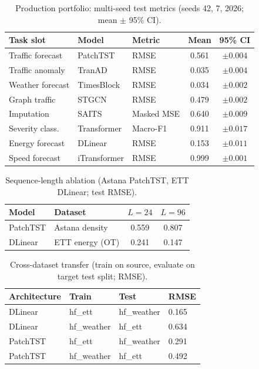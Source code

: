 \begin{table}[H]
  \centering
  \caption{Production portfolio: multi-seed test metrics (seeds 42, 7, 2026; mean $\pm$ 95\% CI).}
  \label{tab:multiseed_aggregate}
  \small
  \begin{tabular}{@{}lllcc@{}}
    \toprule
    \textbf{Task slot} & \textbf{Model} & \textbf{Metric} & \textbf{Mean} & \textbf{95\% CI} \\
    \midrule
    Traffic forecast & PatchTST & RMSE & 0.561 & $\pm 0.004$ \\
    Traffic anomaly & TranAD & RMSE & 0.035 & $\pm 0.004$ \\
    Weather forecast & TimesBlock & RMSE & 0.034 & $\pm 0.002$ \\
    Graph traffic & STGCN & RMSE & 0.479 & $\pm 0.002$ \\
    Imputation & SAITS & Masked MSE & 0.640 & $\pm 0.009$ \\
    Severity class. & Transformer & Macro-F1 & 0.911 & $\pm 0.017$ \\
    Energy forecast & DLinear & RMSE & 0.153 & $\pm 0.011$ \\
    Speed forecast & iTransformer & RMSE & 0.999 & $\pm 0.001$ \\
    \bottomrule
  \end{tabular}
\end{table}

\begin{table}[H]
  \centering
  \caption{Sequence-length ablation (Astana PatchTST, ETT DLinear; test RMSE).}
  \label{tab:seq_ablation}
  \begin{tabular}{@{}llcc@{}}
    \toprule
    \textbf{Model} & \textbf{Dataset} & $L=24$ & $L=96$ \\
    \midrule
    PatchTST & Astana density & 0.559 & 0.807 \\
    DLinear & ETT energy (OT) & 0.241 & 0.147 \\
    \bottomrule
  \end{tabular}
\end{table}

\begin{table}[H]
  \centering
  \caption{Cross-dataset transfer (train on source, evaluate on target test split; RMSE).}
  \label{tab:cross_transfer}
  \small
  \begin{tabular}{@{}llll@{}}
    \toprule
    \textbf{Architecture} & \textbf{Train} & \textbf{Test} & \textbf{RMSE} \\
    \midrule
    DLinear & hf\_ett & hf\_weather & 0.165 \\
    DLinear & hf\_weather & hf\_ett & 0.634 \\
    PatchTST & hf\_ett & hf\_weather & 0.291 \\
    PatchTST & hf\_weather & hf\_ett & 0.492 \\
    \bottomrule
  \end{tabular}
\end{table}
